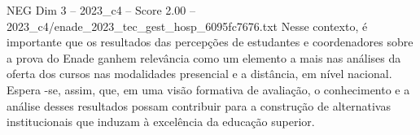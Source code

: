 \begin{textsample}{NEG Dim 3 – 2023\_c4 – Score 2.00 – 2023\_c4/enade\_2023\_tec\_gest\_hosp\_6095fc7676.txt}
Nesse contexto, é importante que os resultados das percepções de estudantes e coordenadores sobre a prova do Enade ganhem relevância como um elemento a mais nas análises da oferta dos cursos nas modalidades presencial e a distância, em nível nacional.
Espera -se, assim, que, em uma visão formativa de avaliação, o conhecimento e a análise desses resultados possam contribuir para a construção de alternativas institucionais que induzam à excelência da educação superior.

\end{textsample}
